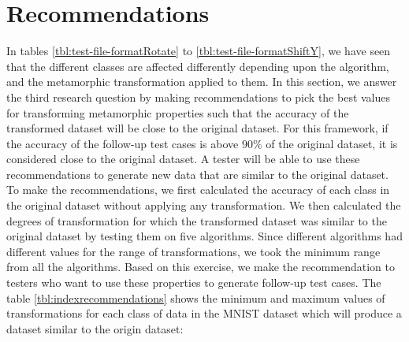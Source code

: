 \section{Recommendations}
In tables \ref{tbl:test-file-formatRotate} to \ref{tbl:test-file-formatShiftY}, we have seen that the different classes are affected differently depending upon the algorithm, and the metamorphic transformation applied to them. In this section, we answer the third research question by making recommendations to pick the best values for transforming metamorphic properties such that the accuracy of the transformed dataset will be close to the original dataset. For this framework, if the accuracy of the follow-up test cases is above $90\%$ of the original dataset, it is considered close to the original dataset. A tester will be able to use these recommendations to generate new data that are similar to the original dataset.
To make the recommendations, we first calculated the accuracy of each class in the original dataset without applying any transformation. We then calculated the degrees of transformation for which the transformed dataset was similar to the original dataset by testing them on five algorithms. Since different algorithms had different values for the range of transformations, we took the minimum range from all the algorithms.
Based on this exercise, we make the recommendation to testers who want to use these properties to generate follow-up test cases. The table \ref{tbl:indexrecommendations} shows the minimum and maximum values of transformations for each class of data in the MNIST dataset which will produce a dataset similar to the origin dataset: 

